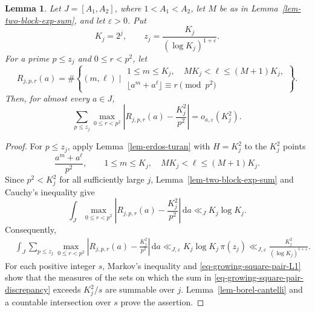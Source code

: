 \documentclass[11pt,reqno]{amsart}
\numberwithin{equation}{section}
\newtheorem{lemma}[theorem]{Lemma}
\begin{document}
    \begin{lemma}\label{lem-growing-square-pairs}
        Let $J=[A_1,A_2]$, where $1<A_1<A_2$, let $M$ be as in Lemma~\ref{lem-two-block-exp-sum}, and let $\varepsilon>0$. Put
        $$
        K_j=2^j,
        \qquad
        z_j=\frac{K_j}{(\log K_j)^{1+\varepsilon}}.
        $$
        For a prime $p\le z_j$ and $0\le r<p^2$, let
        $$
        R_{j,p,r}(a)
        =
        \#\left\{(m,\ell)\mid
        \begin{array}{c}
        1\le m\le K_j,\quad MK_j<\ell\le(M+1)K_j,\\
        \lfloor a^m+a^\ell\rfloor\equiv r\pmod{p^2}
        \end{array}
        \right\}.
        $$
        Then, for almost every $a\in J$,
        \begin{equation}\label{eq-growing-square-pair-discrepancy}
        \sum_{p\le z_j}
        \max_{0\le r<p^2}
        \left|R_{j,p,r}(a)-\frac{K_j^2}{p^2}\right|
        =o_{a,\varepsilon}(K_j^2).
        \end{equation}
    \end{lemma}

    \begin{proof}
        For $p\le z_j$, apply Lemma~\ref{lem-erdos-turan} with $H=K_j^2$ to the $K_j^2$ points
        $$
        \frac{a^m+a^\ell}{p^2},
        \qquad
        1\le m\le K_j,
        \quad
        MK_j<\ell\le(M+1)K_j.
        $$
        Since $p^2<K_j^2$ for all sufficiently large $j$, Lemma~\ref{lem-two-block-exp-sum} and Cauchy's inequality give
        $$
        \int_J
        \max_{0\le r<p^2}
        \left|R_{j,p,r}(a)-\frac{K_j^2}{p^2}\right|\,\mathrm{d}a
        \ll_J K_j\log K_j.
        $$
        Consequently,
        \begin{align}\label{eq-growing-square-pair-L1}
        &\int_J
        \sum_{p\le z_j}
        \max_{0\le r<p^2}
        \left|R_{j,p,r}(a)-\frac{K_j^2}{p^2}\right|\,\mathrm{d}a
        \ll_{J,\varepsilon}
        K_j\log K_j\,\pi(z_j)
        \ll_{J,\varepsilon}
        \frac{K_j^2}{(\log K_j)^{1+\varepsilon}}.
        \end{align}
        For each positive integer $s$, Markov's inequality and \eqref{eq-growing-square-pair-L1} show that the measures of the sets on which the sum in \eqref{eq-growing-square-pair-discrepancy} exceeds $K_j^2/s$ are summable over $j$. Lemma~\ref{lem-borel-cantelli} and a countable intersection over $s$ prove the assertion.
    \end{proof}
\end{document}
